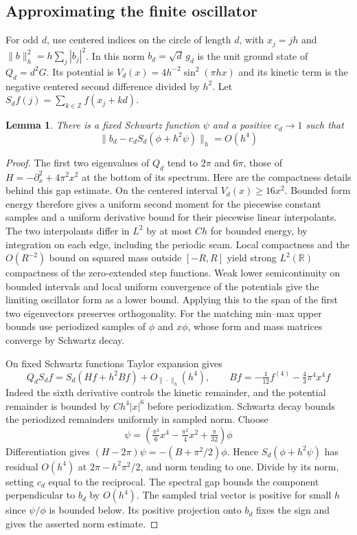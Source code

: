 \documentclass[11pt,reqno]{amsart}
\newtheorem{lemma}[theorem]{Lemma}
\newcommand{\Z}{\mathbb Z}
\newcommand{\R}{\mathbb R}
\begin{document}
\subsection{Approximating the finite oscillator}
For odd $d$, use centered indices on the circle of length $d$, with $x_j=jh$ and $\|b\|_h^2=h\sum_j|b_j|^2$. In this norm $b_d=\sqrt d\,g_d$ is the unit ground state of $Q_d=d^2G$. Its potential is $V_d(x)=4h^{-2}\sin^2(\pi hx)$ and its kinetic term is the negative centered second difference divided by $h^2$. Let $S_df(j)=\sum_{k\in\Z}f(x_j+kd)$.
\begin{lemma}\label{lem:osc}
There is a fixed Schwartz function $\psi$ and a positive $c_d\to1$ such that
\[
 \|b_d-c_d S_d(\phi+h^2\psi)\|_h=O(h^4)
\]
\end{lemma}
\begin{proof}
The first two eigenvalues of $Q_d$ tend to $2\pi$ and $6\pi$, those of $H=-\partial_x^2+4\pi^2x^2$ at the bottom of its spectrum. Here are the compactness details behind this gap estimate. On the centered interval $V_d(x)\ge16x^2$. Bounded form energy therefore gives a uniform second moment for the piecewise constant samples and a uniform derivative bound for their piecewise linear interpolants. The two interpolants differ in $L^2$ by at most $Ch$ for bounded energy, by integration on each edge, including the periodic seam. Local compactness and the $O(R^{-2})$ bound on squared mass outside $[-R,R]$ yield strong $L^2(\R)$ compactness of the zero-extended step functions. Weak lower semicontinuity on bounded intervals and local uniform convergence of the potentials give the limiting oscillator form as a lower bound. Applying this to the span of the first two eigenvectors preserves orthogonality. For the matching min--max upper bounds use periodized samples of $\phi$ and $x\phi$, whose form and mass matrices converge by Schwartz decay.

On fixed Schwartz functions Taylor expansion gives
\[
 Q_d S_df=S_d(Hf+h^2Bf)+O_{\|\cdot\|_h}(h^4),\qquad
 Bf=-\tfrac1{12}f^{(4)}-\tfrac43\pi^4 x^4 f
\]
Indeed the sixth derivative controls the kinetic remainder, and the potential remainder is bounded by $Ch^4|x|^6$ before periodization. Schwartz decay bounds the periodized remainders uniformly in sampled norm. Choose
\[
 \psi=\left(\tfrac{\pi^3}6x^4-\tfrac{\pi^2}4x^2+\tfrac\pi{32}\right)\phi
\]
Differentiation gives $(H-2\pi)\psi=-(B+\pi^2/2)\phi$. Hence $S_d(\phi+h^2\psi)$ has residual $O(h^4)$ at $2\pi-h^2\pi^2/2$, and norm tending to one. Divide by its norm, setting $c_d$ equal to the reciprocal. The spectral gap bounds the component perpendicular to $b_d$ by $O(h^4)$. The sampled trial vector is positive for small $h$ since $\psi/\phi$ is bounded below. Its positive projection onto $b_d$ fixes the sign and gives the asserted norm estimate.
\end{proof}
\end{document}
